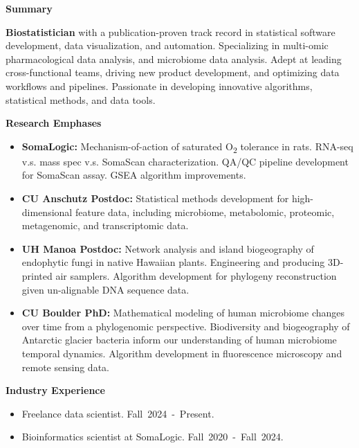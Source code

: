 \documentclass{article}
\begin{document}
%
\vspace{2mm}
%
{\large\textbf{Summary}}
\begin{adjustwidth}{5mm}{}
  \textbf{Biostatistician} with a publication-proven track record in statistical software development, data visualization, and automation. Specializing in multi-omic pharmacological data analysis, and microbiome data analysis. Adept at leading cross-functional teams, driving new product development, and optimizing data workflows and pipelines. Passionate in developing innovative algorithms, statistical methods, and data tools. 
\end{adjustwidth}
\vspace{2mm}
%
{\large\textbf{Research Emphases}}
\begin{adjustwidth}{5mm}{}
  \begin{itemize}[noitemsep,topsep=0pt, leftmargin=5mm]
    \item \textbf{SomaLogic:} Mechanism-of-action of saturated O\textsubscript{2} tolerance in rats. RNA-seq v.s. mass spec v.s. SomaScan characterization. QA/QC pipeline development for SomaScan assay. GSEA algorithm improvements.
    \item \textbf{CU Anschutz Postdoc:} Statistical methods development for high-dimensional feature data, including microbiome, metabolomic, proteomic, metagenomic, and transcriptomic data.
    \item \textbf{UH Manoa Postdoc:} Network analysis and island biogeography of endophytic fungi in native Hawaiian plants. Engineering and producing 3D-printed air samplers. Algorithm development for phylogeny reconstruction given un-alignable DNA sequence data.
    \item \textbf{CU Boulder PhD:} Mathematical modeling of human microbiome changes over time from a phylogenomic perspective. Biodiversity and biogeography of Antarctic glacier bacteria inform our understanding of human microbiome temporal dynamics. Algorithm development in fluorescence microscopy and remote sensing data. 
  \end{itemize}
\end{adjustwidth}
%
\vspace{2mm} 
%
{\large  \textbf{Industry Experience}}
\begin{adjustwidth}{5mm}{}
  \begin{itemize}[noitemsep,topsep=0pt, leftmargin=5mm]
    \item Freelance data scientist. \mbox{Fall 2024 - Present.}
    \item Bioinformatics scientist at SomaLogic. \mbox{Fall 2020 - Fall 2024.}
  \end{itemize}
\end{adjustwidth}
\end{document}
